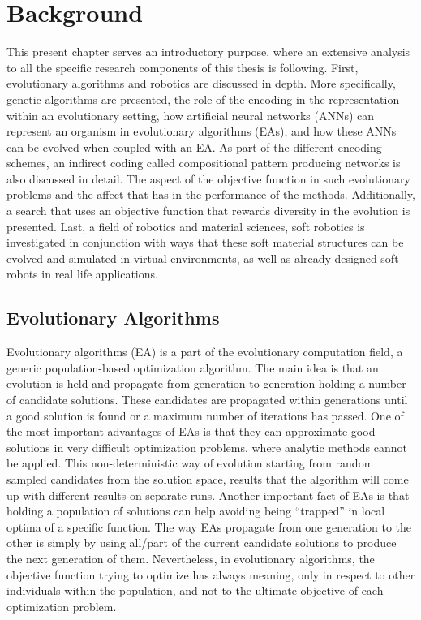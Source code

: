 
\chapter{Background} %

\label{Background} %


This present chapter serves an introductory purpose, where an extensive analysis to all the specific research components of this thesis is following. First, evolutionary algorithms and robotics are discussed in depth. More specifically, genetic algorithms are presented, the role of the encoding in the representation within an evolutionary setting,  how artificial neural networks (ANNs) can represent an organism in evolutionary algorithms (EAs), and how these ANNs can be evolved when coupled with an EA. As part of the different encoding schemes, an indirect coding called compositional pattern producing networks is also discussed in detail. The aspect of the objective function in such evolutionary problems and the affect that has in the performance of the methods. Additionally, a search that uses an objective function that rewards diversity in the evolution is presented. Last, a field of robotics and material sciences, soft robotics is investigated in conjunction with ways that these soft material structures can be evolved and simulated in virtual environments, as well as already designed soft-robots in real life applications.




\section{Evolutionary Algorithms}

Evolutionary algorithms (EA) is a part of the evolutionary computation field, a generic population-based optimization algorithm. The main idea is that an evolution is held and propagate from generation to generation holding a number of candidate solutions. These candidates are propagated within generations until a good solution is found or a maximum number of iterations has passed. One of the most important advantages of EAs is that they can approximate good solutions in very difficult optimization problems, where analytic methods cannot be applied. This non-deterministic way of evolution starting from random sampled candidates from the solution space, results that the algorithm will come up with different results on separate runs. Another important fact of EAs is that holding a population of solutions can help avoiding being ``trapped'' in local optima of a specific function. The way EAs propagate from one generation to the other is simply by using all/part of the current candidate solutions to produce the next generation of them. Nevertheless, in evolutionary algorithms, the objective function trying to optimize has always meaning, only in respect to other individuals within the population, and not to the ultimate objective of each optimization problem.


